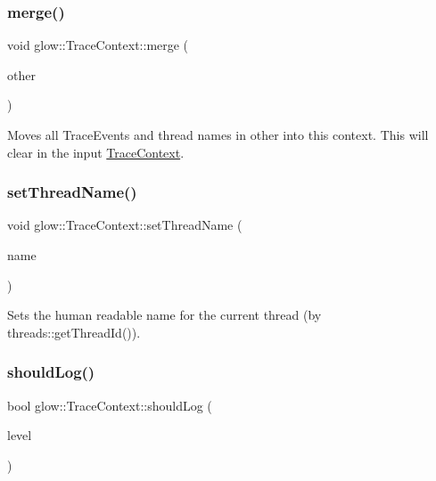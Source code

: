 \subsubsection{\texorpdfstring{merge()}{merge()}\hspace{0.1cm}{\footnotesize\ttfamily [2/2]}}
{\footnotesize\ttfamily void glow\+::\+Trace\+Context\+::merge (\begin{DoxyParamCaption}\item[{std\+::unique\+\_\+ptr$<$ \hyperlink{classglow_1_1_trace_context}{Trace\+Context} $>$}]{other }\end{DoxyParamCaption})\hspace{0.3cm}{\ttfamily [inline]}}

Moves all Trace\+Events and thread names in {\ttfamily other} into this context. This will clear in the input \hyperlink{classglow_1_1_trace_context}{Trace\+Context}. \mbox{\label{classglow_1_1_trace_context_ac663b3fff088f7c9a70c0d31f5501ea0}} 
\subsubsection{\texorpdfstring{set\+Thread\+Name()}{setThreadName()}}
{\footnotesize\ttfamily void glow\+::\+Trace\+Context\+::set\+Thread\+Name (\begin{DoxyParamCaption}\item[{llvm\+::\+String\+Ref}]{name }\end{DoxyParamCaption})}

Sets the human readable {\ttfamily name} for the current thread (by threads\+::get\+Thread\+Id()). \mbox{\label{classglow_1_1_trace_context_a9b38e028fc617b1dd53e9c11c01ca506}} 
\subsubsection{\texorpdfstring{should\+Log()}{shouldLog()}}
{\footnotesize\ttfamily bool glow\+::\+Trace\+Context\+::should\+Log (\begin{DoxyParamCaption}\item[{\hyperlink{structglow_1_1_trace_event_a10132a384d74408a112510cbe1b7d978}{Trace\+Level}}]{level }\end{DoxyParamCaption})\hspace{0.3cm}{\ttfamily [inline]}}

